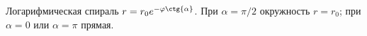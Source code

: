 Логарифмическая спираль $r = r_0e^{-\varphi \ctg{\alpha}}$.
При $\alpha = \pi/2$ окружность $r = r_0$; при $\alpha = 0$
или $\alpha = \pi$ прямая.
